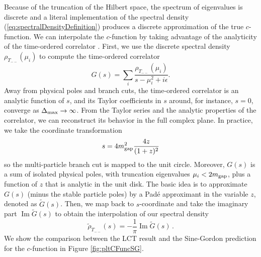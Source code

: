 \documentclass[12pt]{article}
\renewcommand{\Im}[0]{\operatorname{Im}}
\begin{document}
Because of the truncation of the Hilbert space, the spectrum of eigenvalues is discrete and a literal implementation of the spectral density (\ref{eq:spectralDensityDefinition})  produces a discrete approximation of the true $c$-function. We can interpolate the $c$-function by taking advantage of the analyticity of the time-ordered correlator \cite{Chen:2021bmm}. First, we use the discrete spectral density $\rho_{T_{--}}(\mu_i)$ to compute the time-ordered correlator 
\begin{equation}
G(s) = \sum_i \frac{\rho_{T_{--}}(\mu_i)}{s - \mu_i^2 + i\epsilon} .
\end{equation}
Away from physical poles and branch cuts, the time-ordered correlator is an analytic function of $s$, and its Taylor coefficients in $s$ around, for instance, $s=0$, converge as $\Delta_{\rm max} \rightarrow \infty$.  From the Taylor series and the analytic properties of the correlator, we can reconstruct its behavior in the full complex plane.  
In practice,  we take the coordinate transformation
\begin{equation}
s = 4 m_{\rm gap}^2 \frac{4 z}{(1+z)^2}
\end{equation}
so the multi-particle branch cut is mapped to the unit circle. Moreover, $G(s)$ is a sum of isolated physical poles, with truncation eigenvalues $\mu_i < 2 m_{\rm gap}$, plus a function of $z$ that is analytic in the unit disk.  The basic idea is to approximate $G(s)$ (minus the stable particle poles) by a Pad\'e approximant in the variable $z$, denoted as $\tilde G(s)$. 
Then, we map back to $s$-coordinate and take the imaginary part $\Im \tilde G(s)$ to obtain the interpolation of our spectral density
\begin{equation}
\tilde \rho_{T_{--}}(s) = -\frac{1}{\pi} \Im \tilde G(s) \, .
\end{equation}
We show the comparison between the LCT result and the Sine-Gordon prediction for the $c$-function in Figure \ref{fig:pltCFuncSG}. 
\end{document}
